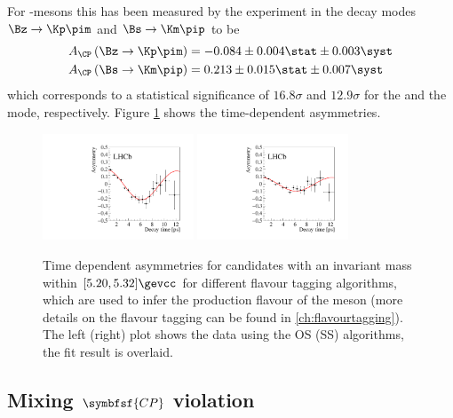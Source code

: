 For \B-mesons this has been measured by the \lhcb experiment in the decay modes $\Bz\to\Kp\pim$ and $\Bs\to\Km\pip$ \cite{LHCb-PAPER-2013-018} to be
\begin{equation}
\begin{split}
A_{\CP}\left(\Bz\to\Kp\pim\right) &= -0.084\pm0.004\stat \pm 0.003\syst\\
A_{\CP}\left(\Bs\to\Km\pip\right) &= 0.213\pm0.015\stat \pm 0.007\syst
\end{split}
\end{equation}
which corresponds to a statistical significance of $16.8\sigma$ and $12.9\sigma$ for the \Bz and the \Bs mode, respectively.
Figure \ref{fig:DirectCPV} shows the time-dependent asymmetries.
\begin{figure}[tbp]
	\centering
	\includegraphics[width=0.4\textwidth]{03CPV/figs/DirectCPV_1.pdf}
	\includegraphics[width=0.4\textwidth]{03CPV/figs/DirectCPV_2.pdf}
	\caption{Time dependent asymmetries for \Kp\pim candidates with an invariant mass within $[5.20, 5.32]\gevcc$ for different flavour tagging algorithms, which are used to infer the production flavour of the \Bq meson (more details on the flavour tagging can be found in \cref{ch:flavourtagging}). The left (right) plot shows the data using the OS (SS) algorithms, the fit result is overlaid.}
	\label{fig:DirectCPV}
\end{figure}


\subsection[head={Mixing \CP violation},tocentry={Mixing \CP violation}]{Mixing $\symbfsf{C{}P}$ violation}
\label{sec:MixingCPV}

